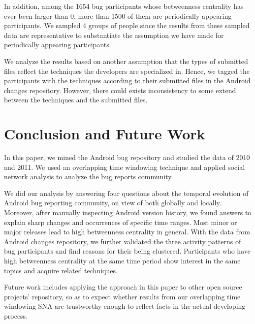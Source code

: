 \documentclass[10pt, conference, compsocconf]{IEEEtran}
\begin{document}
In addition, among the 1654 bug participants whose betweenness centrality has ever been larger than 0, more than 1500 of them are periodically appearing participants. We sampled 4 groups of people since the results from these sampled data are representative to substantiate the assumption we have made for periodically appearing participants.

We analyze the results based on another assumption that the types of submitted files reflect the techniques the developers are specialized in. Hence, we tagged the participants with the techniques according to their submitted files in the Android changes repository. However, there could exists inconsistency to some extend between the techniques and the submitted files. 

\section{Conclusion and Future Work}
\label{conclusion}
In this paper, we mined the Android bug repository and studied the data of 2010 and 2011. We used an overlapping time windowing technique and applied social network analysis to analyze the bug reports community. 

We did our analysis by answering four questions about the temporal evolution of Android bug reporting community, on view of both globally and locally. Moreover, after manually inspecting Android version history, we found answers to explain sharp changes and occurrences of specific time ranges. Most minor or major releases lead to high betweenness centrality in general. With the data from Android changes repository, we further validated the three activity patterns of bug participants and find reasons for their being clustered. Participants who have high betweenness centrality at the same time period show interest in the same topics and acquire related techniques.

Future work includes applying the approach in this paper to other open source projects' repository, so as to expect whether results from our overlapping time windowing SNA are trustworthy enough to reflect facts in the actual developing process. 








\end{document}
